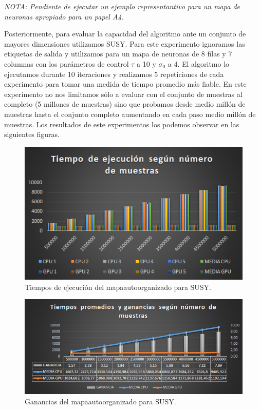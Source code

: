 \textit{NOTA: Pendiente de ejecutar un ejemplo representantivo para un mapa de neuronas apropiado para un papel A4.}

Posteriormente, para evaluar la capacidad del algoritmo ante un conjunto de mayores dimensiones utilizamos SUSY. Para este experimento ignoramos las etiquetas de salida y utilizamos para un mapa de neuronas de 8 filas y 7 columnas con los parámetros de control $\tau$ a 10 y $\sigma_0$ a 4. El algoritmo lo ejecutamos durante 10 iteraciones y realizamos 5 repeticiones de cada experimento para tomar una medida de tiempo promedio más fiable. En este experimento no nos limitamos sólo a evaluar con el conjunto de muestras al completo (5 millones de muestras) sino que probamos desde medio millón de muestras hasta el conjunto completo aumentando en cada paso medio millón de muestras. Los resultados de este experimentos los podemos observar en las siguientes figuras.\\

\begin{figure}[ht]
\centering
\includegraphics[scale=0.8]{imagenes/tiempossusysom.png}
\caption{Tiempos de ejecución del mapaautoorganizado para SUSY.}
\label{img:somsusy}
\end{figure}

\begin{figure}[ht]
\centering
\includegraphics[scale=0.8]{imagenes/gananciassom.png}
\caption{Ganancias del mapaautoorganizado para SUSY.}
\label{img:gananciassomsusy}
\end{figure}

